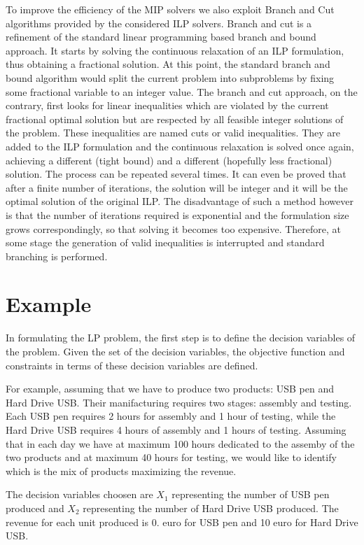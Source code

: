 To improve the efficiency of the M\+IP solvers we also exploit Branch and Cut algorithms provided by the considered I\+LP solvers. Branch and cut is a refinement of the standard linear programming based branch and bound approach. It starts by solving the continuous relaxation of an I\+LP formulation, thus obtaining a fractional solution. At this point, the standard branch and bound algorithm would split the current problem into subproblems by fixing some fractional variable to an integer value. The branch and cut approach, on the contrary, first looks for linear inequalities which are violated by the current fractional optimal solution but are respected by all feasible integer solutions of the problem. These inequalities are named cuts or valid inequalities. They are added to the I\+LP formulation and the continuous relaxation is solved once again, achieving a different (tight bound) and a different (hopefully less fractional) solution. The process can be repeated several times. It can even be proved that after a finite number of iterations, the solution will be integer and it will be the optimal solution of the original I\+LP. The disadvantage of such a method however is that the number of iterations required is exponential and the formulation size grows correspondingly, so that solving it becomes too expensive. Therefore, at some stage the generation of valid inequalities is interrupted and standard branching is performed.\hypertarget{src_ilp_page_ILP_EXAMPLE}{}\section{Example}\label{src_ilp_page_ILP_EXAMPLE}
In formulating the LP problem, the first step is to define the decision variables of the problem. Given the set of the decision variables, the objective function and constraints in terms of these decision variables are defined.

For example, assuming that we have to produce two products\+: U\+SB pen and Hard Drive U\+SB. Their manifacturing requires two stages\+: assembly and testing. Each U\+SB pen requires 2 hours for assembly and 1 hour of testing, while the Hard Drive U\+SB requires 4 hours of assembly and 1 hours of testing. Assuming that in each day we have at maximum 100 hours dedicated to the assemby of the two products and at maximum 40 hours for testing, we would like to identify which is the mix of products maximizing the revenue.

The decision variables choosen are $ X_1 $ representing the number of U\+SB pen produced and $ X_2 $ representing the number of Hard Drive U\+SB produced. The revenue for each unit produced is 0. euro for U\+SB pen and 10 euro for Hard Drive U\+SB.

